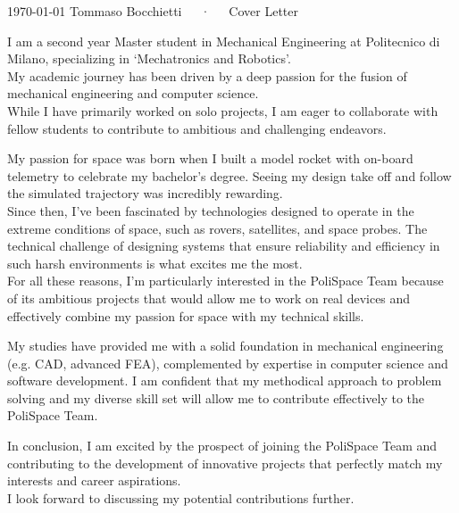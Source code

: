 \documentclass[11pt, a4paper]{awesome-cv}
\begin{document}
\makecvheader[R]

\makecvfooter
{\today}
{Tommaso Bocchietti~~~·~~~Cover Letter}
{}

\makelettertitle

\begin{cvletter}

  I am a second year Master student in Mechanical Engineering at Politecnico di Milano, specializing in `Mechatronics and Robotics'.\\
  My academic journey has been driven by a deep passion for the fusion of mechanical engineering and computer science.\\
  While I have primarily worked on solo projects, I am eager to collaborate with fellow students to contribute to ambitious and challenging endeavors.

  My passion for space was born when I built a model rocket with on-board telemetry to celebrate my bachelor's degree. Seeing my design take off and follow the simulated trajectory was incredibly rewarding.\\
  Since then, I've been fascinated by technologies designed to operate in the extreme conditions of space, such as rovers, satellites, and space probes.
  The technical challenge of designing systems that ensure reliability and efficiency in such harsh environments is what excites me the most.\\
  For all these reasons, I'm particularly interested in the PoliSpace Team because of its ambitious projects that would allow me to work on real devices and effectively combine my passion for space with my technical skills.

  My studies have provided me with a solid foundation in mechanical engineering (e.g. CAD, advanced FEA), complemented by expertise in computer science and software development.
  I am confident that my methodical approach to problem solving and my diverse skill set will allow me to contribute effectively to the PoliSpace Team.

  In conclusion, I am excited by the prospect of joining the PoliSpace Team and contributing to the development of innovative projects that perfectly match my interests and career aspirations.\\
  I look forward to discussing my potential contributions further.

\end{cvletter}



\makeletterclosing
\end{document}

